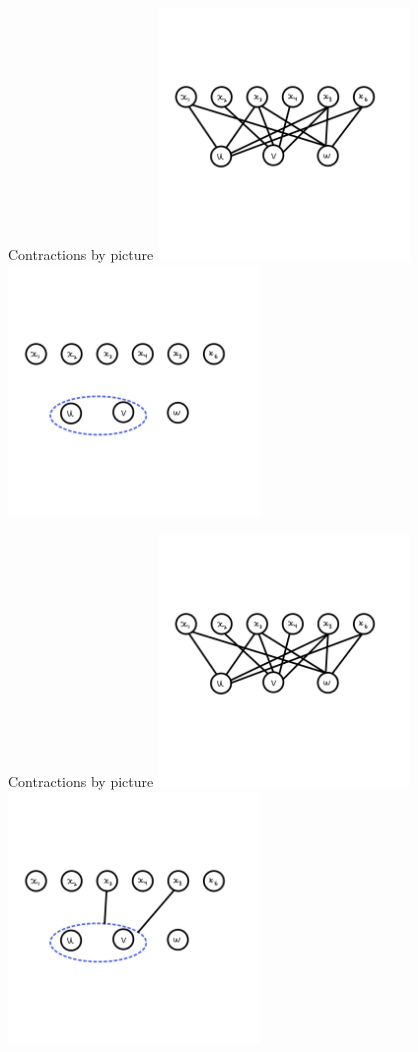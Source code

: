 \documentclass[aspectratio=169]{beamer}
\begin{document}
\begin{frame}{Contractions by picture}
    \includegraphics[width=0.5\textwidth]{images/cropped-01.jpg}%
    \includegraphics[width=0.5\textwidth]{images/cropped-03.jpg}
\end{frame}

\begin{frame}{Contractions by picture}
    \includegraphics[width=0.5\textwidth]{images/cropped-01.jpg}%
    \includegraphics[width=0.5\textwidth]{images/cropped-04.jpg}
\end{frame}
\end{document}
